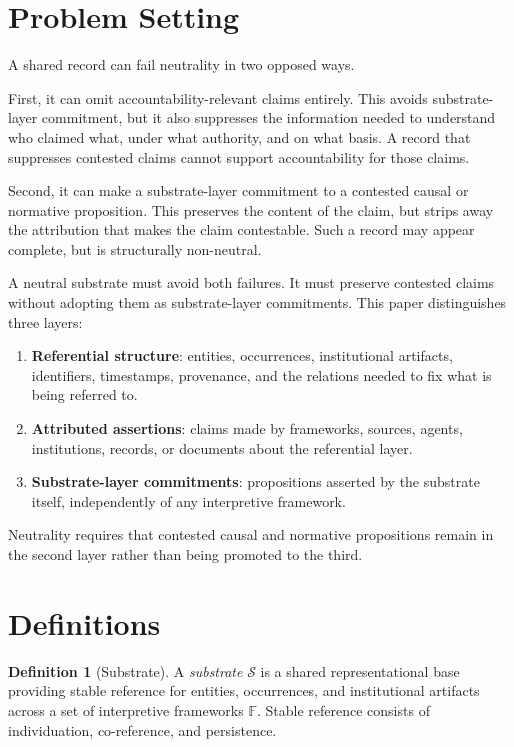 \documentclass[11pt]{article}
\theoremstyle{plain}
\theoremstyle{definition}
\newtheorem{definition}[theorem]{Definition}
\theoremstyle{remark}
\newcommand{\Substrate}{\mathcal{S}}
\newcommand{\Frameworks}{\mathbb{F}}
\begin{document}
\section{Problem Setting}
\label{sec:problem-setting}

A shared record can fail neutrality in two opposed ways.

First, it can omit accountability-relevant claims entirely.
This avoids substrate-layer commitment,
but it also suppresses the information needed to understand
who claimed what, under what authority, and on what basis.
A record that suppresses contested claims cannot support accountability
for those claims.

Second, it can make a substrate-layer commitment
to a contested causal or normative proposition.
This preserves the content of the claim,
but strips away the attribution that makes the claim contestable.
Such a record may appear complete, but is structurally non-neutral.

A neutral substrate must avoid both failures.
It must preserve contested claims without adopting them
as substrate-layer commitments.
This paper distinguishes three layers:

\begin{enumerate}
  \item \textbf{Referential structure}: entities, occurrences, institutional
        artifacts, identifiers, timestamps, provenance, and the relations needed to
        fix what is being referred to.
  \item \textbf{Attributed assertions}: claims made by frameworks, sources,
        agents, institutions, records, or documents about the referential layer.
  \item \textbf{Substrate-layer commitments}: propositions asserted by the
        substrate itself, independently of any interpretive framework.
\end{enumerate}

Neutrality requires that contested causal and normative propositions remain in
the second layer rather than being promoted to the third.

\section{Definitions}
\label{sec:definitions}

\begin{definition}[Substrate]
  \label{se100.def.Substrate}
  A \emph{substrate} $\Substrate$ is a shared representational base providing
  stable reference for entities, occurrences, and institutional artifacts
  across a set of interpretive frameworks $\Frameworks$.
  Stable reference consists of individuation, co-reference, and persistence.
\end{definition}
\end{document}
